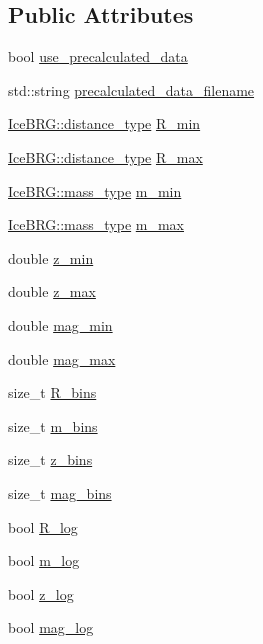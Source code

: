 \subsection*{Public Attributes}
\begin{DoxyCompactItemize}
\item 
bool \hyperlink{structgg__lensing__config_a3fe4ca186ed399f741d499e1e0e4acf8}{use\+\_\+precalculated\+\_\+data}
\item 
std\+::string \hyperlink{structgg__lensing__config_a8bc252029c599446dfbba897920eca0f}{precalculated\+\_\+data\+\_\+filename}
\item 
\hyperlink{namespaceIceBRG_a45499647eb87e24c10ab32c628711cec}{Ice\+B\+R\+G\+::distance\+\_\+type} \hyperlink{structgg__lensing__config_a14445ac28a5b6e168d407b5a862fa186}{R\+\_\+min}
\item 
\hyperlink{namespaceIceBRG_a45499647eb87e24c10ab32c628711cec}{Ice\+B\+R\+G\+::distance\+\_\+type} \hyperlink{structgg__lensing__config_a18e40e60fa8b0f06e7550eb3c0411a8b}{R\+\_\+max}
\item 
\hyperlink{namespaceIceBRG_a1be72ac4918a9b029f2eefa084213e35}{Ice\+B\+R\+G\+::mass\+\_\+type} \hyperlink{structgg__lensing__config_af80680456a55ac0efca1fa309d1611f2}{m\+\_\+min}
\item 
\hyperlink{namespaceIceBRG_a1be72ac4918a9b029f2eefa084213e35}{Ice\+B\+R\+G\+::mass\+\_\+type} \hyperlink{structgg__lensing__config_a0b33d2e197f1972c8164567295f83f87}{m\+\_\+max}
\item 
double \hyperlink{structgg__lensing__config_a983f7b673fc379bfcc96e69820057f8e}{z\+\_\+min}
\item 
double \hyperlink{structgg__lensing__config_a16239d6e2c8ad5c3850abf9a47096701}{z\+\_\+max}
\item 
double \hyperlink{structgg__lensing__config_a51c75e4b7d5da1bb3dff5979131259c9}{mag\+\_\+min}
\item 
double \hyperlink{structgg__lensing__config_a3f234006efbd74be8b82a79ca4bda522}{mag\+\_\+max}
\item 
size\+\_\+t \hyperlink{structgg__lensing__config_a0222122d7470e67e7aeb52096fcb6f90}{R\+\_\+bins}
\item 
size\+\_\+t \hyperlink{structgg__lensing__config_a80fc5e7efdd390f1d3d96898471802cc}{m\+\_\+bins}
\item 
size\+\_\+t \hyperlink{structgg__lensing__config_aff53350063b74ef73c8cea9b89a8780e}{z\+\_\+bins}
\item 
size\+\_\+t \hyperlink{structgg__lensing__config_a3c82853304ede01b0697d0c05d0db1d0}{mag\+\_\+bins}
\item 
bool \hyperlink{structgg__lensing__config_a4ca415b5664d589eadea71166aaba4bc}{R\+\_\+log}
\item 
bool \hyperlink{structgg__lensing__config_ad92bfc552d828962e8a5525999ae0a6b}{m\+\_\+log}
\item 
bool \hyperlink{structgg__lensing__config_a454b771c419a63d1512bbd220257b095}{z\+\_\+log}
\item 
bool \hyperlink{structgg__lensing__config_aefcae2d2981313e2c3ef4f9e378d9976}{mag\+\_\+log}
\end{DoxyCompactItemize}
